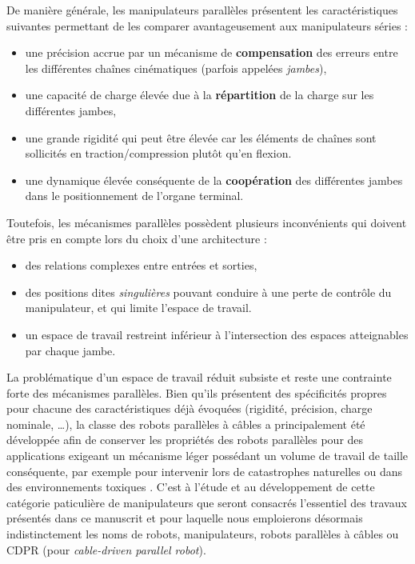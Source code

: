 De manière générale, les manipulateurs parallèles présentent les caractéristi\-ques sui\-vantes permettant de les comparer avantageusement aux manipulateurs séries :
\begin{itemize}
 \item une précision accrue par un mécanisme de {\bf compensation} des erreurs entre les différentes chaînes cinématiques (parfois appelées {\it jambes}),
 \item une capacité de charge élevée due à la {\bf répartition} de la charge sur les différentes jambes,
 \item une grande rigidité qui peut être élevée car les éléments de chaînes sont sollicités en traction/compression plutôt qu'en flexion.
 \item une dynamique élevée conséquente de la {\bf coopération} des différentes jam\-bes dans le positionnement de l'organe terminal.
\end{itemize}

Toutefois, les mécanismes parallèles possèdent plusieurs inconvénients qui doivent être pris en compte lors du choix d'une architecture :
\begin{itemize}
 \item des relations complexes entre entrées et sorties,
 \item des positions dites {\it singulières} pouvant conduire à une perte de contrôle du manipulateur, et qui limite l'espace de travail.
 \item un espace de travail restreint inférieur à l'intersection des espaces atteignables par chaque jambe.
\end{itemize}

La problématique d'un espace de travail réduit subsiste et reste une contrainte forte des mécanismes parallèles. Bien qu'ils présentent des spécificités propres pour chacune des caractéristiques déjà évoquées (rigidité, précision, charge nominale, \dots), la classe des robots parallèles à câbles a principalement été développée afin de conserver les propriétés des robots parallèles pour des applications exigeant un mécanisme léger possédant un volume de travail de taille conséquente, par exemple pour intervenir lors de catastrophes naturelles ou dans des environnements toxiques \cite{1992:Albus.Bostelman.ea}. C'est à l'étude et au développement de cette catégorie paticulière de manipulateurs que seront consacrés l'essentiel des travaux présentés dans ce manuscrit et pour laquelle nous emploierons désormais indistinctement les noms de robots, manipulateurs, robots parallèles à câbles ou CDPR (pour {\it cable-driven parallel robot}).

